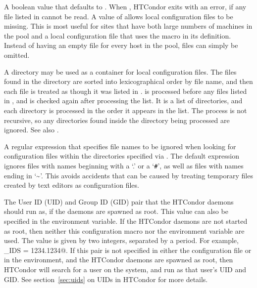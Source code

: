 \begin{description}
\label{param:RequireLocalConfigFile}
\item[\Macro{REQUIRE\_LOCAL\_CONFIG\_FILE}]
  A boolean value that defaults to .
  When , HTCondor exits with an error,
  if any file listed in  cannot be read.
  A value of  allows local configuration files to be missing.
  This is most useful for sites that have 
  both large numbers of machines in the pool and a local configuration file
  that uses the  macro in its definition.
  Instead of having an empty file for every host
  in the pool, files can simply be omitted.

\label{param:LocalConfigDir} 
\item[\Macro{LOCAL\_CONFIG\_DIR}]
  A directory may be used as a container for local configuration files. 
  The files found in the directory are sorted into lexicographical order 
  by file name, and 
  then each file is treated as though it was listed in 
  . 
   is processed before any files listed in 
  , and is checked again after processing
  the  list. 
  It is a list of directories, and each directory is processed in the order
  it appears in the list. 
  The process is not recursive, so any directories found inside the directory
  being processed are ignored. 
  See also .

\label{param:LocalConfigDirExcludeRegexp}
\item[\Macro{LOCAL\_CONFIG\_DIR\_EXCLUDE\_REGEXP}]
  A regular expression that specifies file names to be ignored when
  looking for configuration files within the directories specified via
  .  The default expression ignores files
  with names beginning with a `.' or a `\verb|#|', as well as files with names
  ending in `\~{}'.  This avoids accidents that can be caused by
  treating temporary files created by text editors as configuration
  files.

\label{param:CondorIds}
\item[\Macro{CONDOR\_IDS}]
  The User ID (UID) and Group ID (GID) pair that the HTCondor daemons
  should run as, if the daemons are spawned as root.
  This value can also be specified in the 
  environment variable.
  If the HTCondor daemons are not started as root, then neither this
   configuration macro nor the 
  environment variable are used.
  The value is given by two integers, separated by a period.  For
  example, \verb@CONDOR_IDS = 1234.1234@.
  If this pair is not specified in either the configuration file or in the
  environment, and the HTCondor daemons are spawned as root,
  then HTCondor will
  search for a \verb@condor@ user on the system, and run as that user's
  UID and GID.
  See section~\ref{sec:uids} on UIDs in HTCondor for more details.


\end{description}
